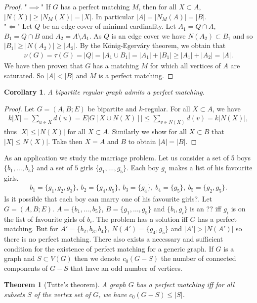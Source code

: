 \documentclass[12pt,a4paper]{article}
\newtheorem{thm}{Theorem}[section]
\newtheorem{cor}{Corollary}[section]
\theoremstyle{definition}
\begin{document}
\begin{proof}
"$\implies$" If $G$ has a perfect matching $M$, then for all $X \subset A$, $|N(X)| \geq |N_M(X)|=|X|$. In particular $|A|=|N_M(A)|=|B|$. \\
"$\Longleftarrow$" Let $Q$ be an edge cover of minimal cardinality. Let $A_1= Q \cap A$, $B_1=Q \cap B$ and $A_2=A \setminus A_1$. As $Q$ is an edge cover we have $N(A_2) \subset B_1$ and so $|B_1| \geq |N(A_2)| \geq |A_2|$. By the König-Egerváry theorem, we obtain that
\begin{align*}
\nu(G)=\tau(G)=|Q|=|A_1 \cup B_1| = |A_1| + |B_1| \geq |A_1| + |A_2| = |A|.
\end{align*}
We have then proven that $G$ has a matching $M$ for which all vertices of $A$ are saturated. So $|A| < |B|$ and $M$ is a perfect matching. 
\end{proof}
\begin{cor} A bipartite regular graph admits a perfect matching.
\end{cor}
\begin{proof}
Let $G=(A,B;E)$ be bipartite and $k$-regular. For all $X \subset A$, we have 
\begin{align*}
k|X|= \sum_{u \in X} d(u) = E|G[X \cup N(X)]|  \leq \sum_{v \in N(X)} d(v) = k |N(X)|,
\end{align*}
thus $|X| \leq |N(X)|$ for all $ X \subset A$. Similarly we show for all $X \subset B$ that $|X| \leq N(X)|$. Take then $X=A$ and $B$ to obtain $|A|=|B|$. 
\end{proof}
As an application we study the marriage problem. Let us consider a set of 5 boys $\{b_1, \dots , b_5\}$ and a set of $5$ girls $\{g_1, \dots , g_5\}$. Each boy $g_i$ makes  a list of his favourite girls. 
\begin{align*}
b_1=\{g_1,g_2,g_3\}, \ b_2=\{g_4,g_5\}, \ b_3=\{g_4\}, \ b_4=\{g_5\}, \ b_5=\{g_2,g_5\}.
\end{align*}
Is it possible that each boy can marry one of his favourite girls?. Let $G=(A,B;E)$. $A=\{b_1, \dots ,  b_5\}$, $B=\{g_1, \dots , g_5\}$ and $\{b_i,g_i\}$ is an ?? iff $g_i$ is on the list of favourite girls of $b_i$. The problem has a solution iff $G$ has a perfect matching. But for $A'=\{b_2,b_3,b_4\}, \ N(A')=\{g_4,g_5\}$ and $|A'| > |N(A')|$ so there is no perfect matching. There also exists a necessary and sufficient condition for the existence of perfect matching for a generic graph. If $G$ is a graph and $S \subset V(G)$ then we denote $c_0(G-S)$ the number of connected components of $G-S$ that have an odd number of vertices. 
\begin{thm}[Tutte's theorem] A graph $G$ has a perfect matching iff for all subsets $S$ of the vertex set of $G$, we have $c_0(G-S) \leq |S|$. 
\end{thm}
\newpage
\end{document}
